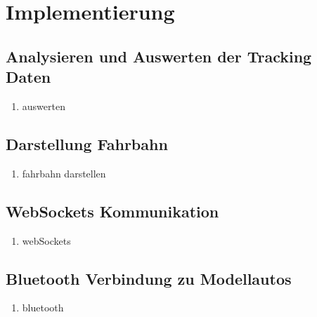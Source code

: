 \chapter{Implementierung}

\section{Analysieren und Auswerten der Tracking Daten}
\begin{enumerate}
\item auswerten
\end{enumerate}

\section{Darstellung Fahrbahn}
\begin{enumerate}
\item fahrbahn darstellen
\end{enumerate}

\section{WebSockets Kommunikation}
\begin{enumerate}
\item webSockets
\end{enumerate}

\section{Bluetooth Verbindung zu Modellautos}
\begin{enumerate}
\item bluetooth
\end{enumerate}
